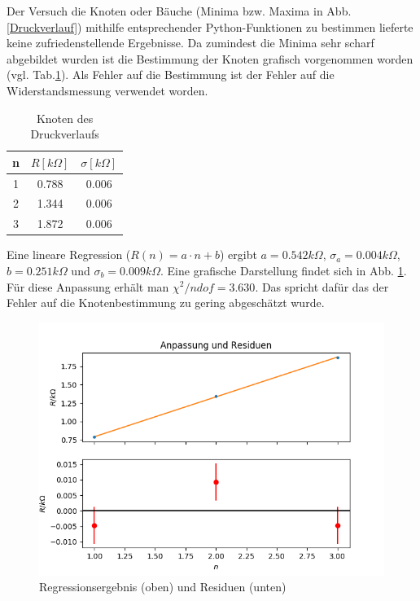 \documentclass[12pt,a4paper]{article}
\begin{document}
Der Versuch die Knoten oder Bäuche (Minima bzw. Maxima in Abb. \ref{Druckverlauf}) mithilfe entsprechender Python-Funktionen zu bestimmen lieferte keine zufriedenstellende Ergebnisse.
Da zumindest die Minima sehr scharf abgebildet wurden ist die Bestimmung der Knoten grafisch vorgenommen worden (vgl. Tab.\ref{tab:Druckknoten}). Als Fehler auf die Bestimmung ist der Fehler auf die Widerstandsmessung verwendet worden.

\begin{table}
	\begin{center}
		\begin{tabular}{|c|c|c|}
			\hline 
			n & $R[k\Omega]$ & $\sigma[k\Omega]$ \\ 
			\hline 
			1 & 0.788  & 0.006 \\ 
			\hline 
			2 & 1.344  & 0.006 \\ 
			\hline 
			3 & 1.872 & 0.006 \\ 
			\hline 
		\end{tabular}
		\caption[Druckknoten]{Knoten des Druckverlaufs}
		\label{tab:Druckknoten}
	\end{center}
\end{table}

Eine lineare Regression ($R(n)=a \cdot n+b$) ergibt $a=0.542k\Omega$, $\sigma_{a}=0.004k\Omega$, $b=0.251k\Omega$ und $\sigma_b=0.009k\Omega$. Eine grafische Darstellung findet sich in Abb. \ref{fig:Regression Druckverlauf}.\\
Für diese Anpassung erhält man $\chi^2/ndof=3.630$. Das spricht dafür das der Fehler auf die Knotenbestimmung zu gering abgeschätzt wurde.

\begin{figure}
	\includegraphics[width=\linewidth]{fitdruckknoten}
	\caption[Regression Knoten]{Regressionsergebnis (oben) und Residuen (unten)}
	\label{fig:Regression Druckverlauf}
\end{figure}
\end{document}
